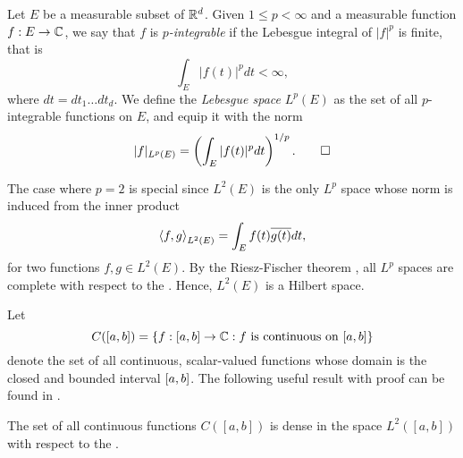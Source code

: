 \documentclass[../thesis.tex]{subfiles}
\begin{document}
\begin{definition} %
    Let $E$ be a measurable subset of $\mathbb{R}^d$. Given $1 \leq p < \infty$ and a measurable function $f:E\rightarrow \mathbb{C}$, we say that $f$ is \emph{$p$-integrable} if the Lebesgue integral of $|f|^p$ is finite, that is
    \begin{equation*}
        \int_{E} |f(t)|^p dt < \infty,
    \end{equation*}
    where $dt= dt_1 \dots dt_d$. We define the \emph{Lebesgue space} $L^p(E)$ as the set of all $p$-integrable functions on $E$, and equip it with the norm
    \begin{equation*}
        |f|_{L^p(E)} = \left(\int_{E} |f(t)|^p dt\right)^{1/p}. \qedhere
    \end{equation*}
\end{definition}

The case where $p=2$ is special since $L^2(E)$ is the only $L^p$ space whose norm is induced from the inner product
\begin{equation*}
    \left \langle f, g \right \rangle_{L^2(E)} = \int_{E} f(t)\overline{g(t)} dt,
\end{equation*}
for two functions $f,g\in L^2(E)$. By the Riesz-Fischer theorem \cite[p.~279]{heilIntroductionRealAnalysis2019}, all $L^p$ spaces are complete with respect to the \LPnorm. Hence, $L^2(E)$ is a Hilbert space. 

Let
\begin{equation*}
    C([a,b]) = \{f:[a,b] \rightarrow \mathbb{C}: f \text{ is continuous on } [a,b]\}
\end{equation*}
denote the set of all continuous, scalar-valued functions whose domain is the closed and bounded interval $[a,b]$. The following useful result with proof can be found in \cite[p.~326]{rudinPrinciplesMathematicalAnalysis20}. 
\begin{lemma}\label{lem:c_dense_L2}
    The set of all continuous functions $C([a,b])$ is dense in the space $L^2([a,b])$ with respect to the \Ltwonorm.
\end{lemma}
\end{document}

